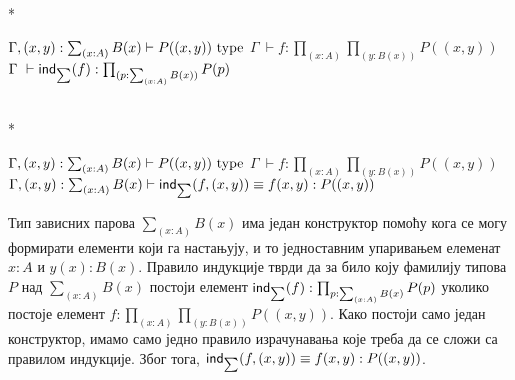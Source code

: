 \documentclass[12pt,oneside]{memoir}
\begin{document}
\begin{samepage}
    \begin{center}
        \begin{minipage}{.40\textwidth}
            \begin{prooftree}
            \end{prooftree}
        \end{minipage}
        \begin{minipage}{.45\textwidth}
            \begin{prooftree}
            \end{prooftree}
        \end{minipage}
        \\*
        \bigskip%
        \begin{minipage}{\textwidth}
            \begin{prooftree}
                \def\fCenter{\Gamma}
                \Axiom$\fCenter, (x, y) : \sum_{(x : A)} B(x) \vdash P((x, y))~\type$
                \noLine%
                \UnaryInf$\fCenter\ \vdash f : \prod_{(x : A)} \prod_{(y : B(x))} P((x, y))$
                \UnaryInf$\fCenter\ \vdash \ind{\sum} (f) : \prod_{(p : \sum_{(x:A)} B(x))} P(p)$
            \end{prooftree}
        \end{minipage}
        \\*
        \bigskip%
        \begin{minipage}{\textwidth}
            \begin{prooftree}
                \def\fCenter{\Gamma}
                \Axiom$\fCenter, (x, y) : \sum_{(x : A)} B(x) \vdash P((x, y))~\type$
                \noLine%
                \UnaryInf$\fCenter\ \vdash f : \prod_{(x : A)} \prod_{(y : B(x))} P((x, y))$
                \UnaryInf$\fCenter, (x, y) : \sum_{(x : A)} B(x) \vdash \ind{\sum} (f, (x, y)) \equiv f(x, y) : P((x, y))$
            \end{prooftree}
        \end{minipage}
    \end{center}
\end{samepage}

    Тип зависних парова $\sum_{(x:A)} B (x)$ има један конструктор помоћу кога се могу формирати елементи који га настањују, и то једноставним упаривањем елеменат $x : A$ и $y(x) : B(x)$. Правило индукције тврди да за било коју фамилију типова $P$ над $\sum_{(x : A)} B (x)$ постоји елемент $\mathsf{ind}_{\sum}(f) : \prod_{p : \sum_{(x : A)} B(x)} P (p)$ уколико постоје елемент $f : \prod_{(x : A)} \prod_{(y : B(x))} P ((x, y))$. Како постоји само један конструктор, имамо само једно правило израчунавања које треба да се сложи са правилом индукције. Због тога, $\mathsf{ind}_{\sum}(f, (x, y)) \equiv f(x, y) : P((x, y))$.
\end{document}
